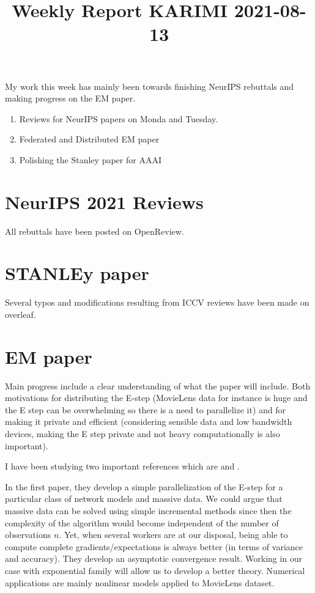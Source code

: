 \documentclass{article}
\begin{document}
\title{Weekly Report KARIMI 2021-08-13}


\date{}
\maketitle

\vspace{-0.5in}

My work this week has mainly been towards finishing NeurIPS rebuttals and making progress on the EM paper.
\begin{enumerate}
\item Reviews for NeurIPS papers on Monda and Tuesday.
\item Federated and Distributed EM paper
\item Polishing the Stanley paper for AAAI
\end{enumerate}

\section{NeurIPS 2021 Reviews}

All rebuttals have been posted on OpenReview.


\section{STANLEy paper}

Several typos and modifications resulting from ICCV reviews have been made on overleaf.


\section{EM paper}

Main progress include a clear understanding of what the paper will include.
Both motivations for distributing the E-step (MovieLens data for instance is huge and the E step can be overwhelming so there is a need to parallelize it) and for making it private and efficient (considering sensible data and low bandwidth devices, making the E step private and not heavy computationally is also important).

I have been studying two important references which are \citep{srivastava2019asynchronous} and \citep{morral2012line}.

In the first paper, they develop a simple parallelization of the E-step for a particular class of network models and massive data.
We could argue that massive data can be solved using simple incremental methods since then the complexity of the algorithm would become independent of the number of observations $n$. Yet, when several workers are at our disposal, being able to compute complete gradients/expectations is always better (in terms of variance and accuracy).
They develop an asymptotic convergence result. Working in our case with exponential family will allow us to develop a better theory.
Numerical applications are mainly nonlinear models applied to MovieLens dataset.
\end{document}
